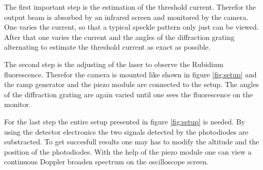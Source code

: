 The first important step is the estimation of the threshold current. Therefor
the output beam is absorbed by an infrared screen and monitored by the camera.
One varies the current, so that a typical speckle pattern only just can be viewed.
After that one varies the current and the angles of the diffraction grating alternating
to estimate the threshold current as exact as possible.

The second step is the adjusting of the laser to observe the Rubidium fluorescence.
Therefor the camera is mounted like shown in figure \ref{fig:setup} and the ramp generator
and the piezo module are connected to the setup. The angles of the diffraction grating are
again varied until one sees the fluorescence on the monitor.

For the last step the entire setup presented in figure \ref{fig:setup} is needed.
By using the detector electronics the two signals detected by the photodiodes are
substracted. To get succesfull results one may has to modify the altitude and the position of the
photodiodes. With the help of the piezo module one can view a continuous
Doppler broaden spectrum on the oscilloscope screen.
